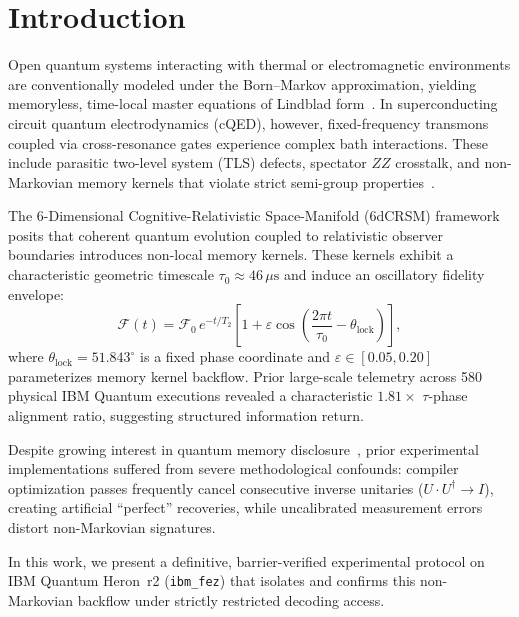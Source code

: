 \documentclass[aps,prxquantum,reprint,superscriptaddress,floatfix]{revtex4-2}
\begin{document}
\maketitle

\section{Introduction}
Open quantum systems interacting with thermal or electromagnetic environments are conventionally modeled under the Born--Markov approximation, yielding memoryless, time-local master equations of Lindblad form~\cite{lindblad1976generators,nielsen2010quantum}. In superconducting circuit quantum electrodynamics (cQED), however, fixed-frequency transmons coupled via cross-resonance gates experience complex bath interactions. These include parasitic two-level system (TLS) defects, spectator $ZZ$ crosstalk, and non-Markovian memory kernels that violate strict semi-group properties~\cite{backer2026revealing,li2025probing}.

The 6-Dimensional Cognitive-Relativistic Space-Manifold (6dCRSM) framework posits that coherent quantum evolution coupled to relativistic observer boundaries introduces non-local memory kernels. These kernels exhibit a characteristic geometric timescale $\tau_0 \approx 46\,\mu\text{s}$ and induce an oscillatory fidelity envelope:
\begin{equation}
    \mathcal{F}(t) = \mathcal{F}_0 \, e^{-t / T_2} \left[ 1 + \varepsilon \cos\left( \frac{2\pi t}{\tau_0} - \theta_{\mathrm{lock}} \right) \right],
    \label{eq:6dcrsm_kernel}
\end{equation}
where $\theta_{\mathrm{lock}} = 51.843^\circ$ is a fixed phase coordinate and $\varepsilon \in [0.05, 0.20]$ parameterizes memory kernel backflow. Prior large-scale telemetry across 580 physical IBM Quantum executions revealed a characteristic $1.81\times$ $\tau$-phase alignment ratio, suggesting structured information return.

Despite growing interest in quantum memory disclosure~\cite{backer2026revealing}, prior experimental implementations suffered from severe methodological confounds: compiler optimization passes frequently cancel consecutive inverse unitaries ($U \cdot U^\dagger \to I$), creating artificial ``perfect'' recoveries, while uncalibrated measurement errors distort non-Markovian signatures. 

In this work, we present a definitive, barrier-verified experimental protocol on IBM Quantum Heron~r2 (\texttt{ibm\_fez}) that isolates and confirms this non-Markovian backflow under strictly restricted decoding access.
\end{document}
